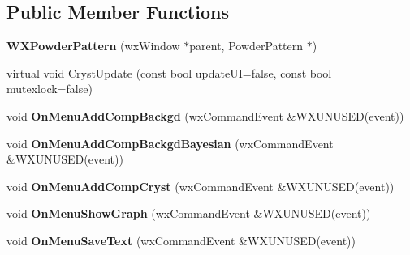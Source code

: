 \subsection*{Public Member Functions}
\begin{DoxyCompactItemize}
\item 
\mbox{\label{class_obj_cryst_1_1_w_x_powder_pattern_aa84a3d15103e9bfb3a8bbaf4d7d18541}} 
{\bfseries W\+X\+Powder\+Pattern} (wx\+Window $\ast$parent, Powder\+Pattern $\ast$)
\item 
virtual void \mbox{\hyperlink{class_obj_cryst_1_1_w_x_powder_pattern_a8bdd59548c11c11a53197c0679c258a8}{Cryst\+Update}} (const bool update\+UI=false, const bool mutexlock=false)
\item 
\mbox{\label{class_obj_cryst_1_1_w_x_powder_pattern_aeeb49071800492bca8286681aec4465a}} 
void {\bfseries On\+Menu\+Add\+Comp\+Backgd} (wx\+Command\+Event \&W\+X\+U\+N\+U\+S\+ED(event))
\item 
\mbox{\label{class_obj_cryst_1_1_w_x_powder_pattern_ad309b6409eadc6ca6b85f7fa44092670}} 
void {\bfseries On\+Menu\+Add\+Comp\+Backgd\+Bayesian} (wx\+Command\+Event \&W\+X\+U\+N\+U\+S\+ED(event))
\item 
\mbox{\label{class_obj_cryst_1_1_w_x_powder_pattern_ada39e690a67bce38f9f851c0b460b7c2}} 
void {\bfseries On\+Menu\+Add\+Comp\+Cryst} (wx\+Command\+Event \&W\+X\+U\+N\+U\+S\+ED(event))
\item 
\mbox{\label{class_obj_cryst_1_1_w_x_powder_pattern_afe312fd6e5c1055baf98a0694aa6ffa6}} 
void {\bfseries On\+Menu\+Show\+Graph} (wx\+Command\+Event \&W\+X\+U\+N\+U\+S\+ED(event))
\item 
\mbox{\label{class_obj_cryst_1_1_w_x_powder_pattern_a61d5da5025b35aca843f773a15947dac}} 
void {\bfseries On\+Menu\+Save\+Text} (wx\+Command\+Event \&W\+X\+U\+N\+U\+S\+ED(event))
\item 
\mbox{\label{class_obj_cryst_1_1_w_x_powder_pattern_a767f1581a45dd9996118a4f60018b010}} 

\end{DoxyCompactItemize}
